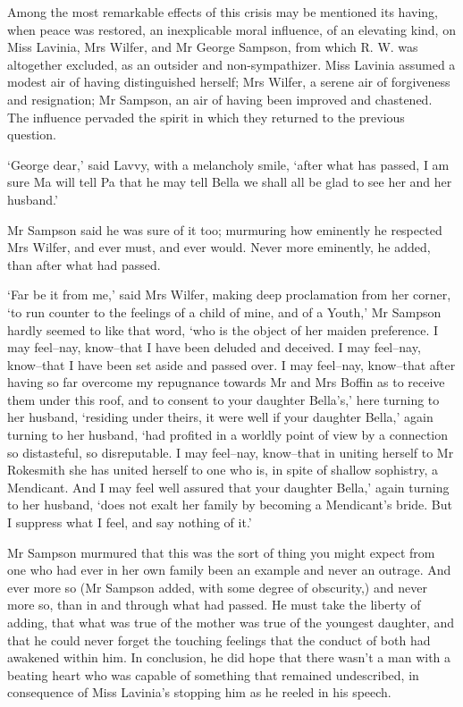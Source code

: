 Among the most remarkable effects of this crisis may be mentioned its
having, when peace was restored, an inexplicable moral influence, of an
elevating kind, on Miss Lavinia, Mrs Wilfer, and Mr George Sampson, from
which R. W. was altogether excluded, as an outsider and non-sympathizer.
Miss Lavinia assumed a modest air of having distinguished herself; Mrs
Wilfer, a serene air of forgiveness and resignation; Mr Sampson, an air
of having been improved and chastened. The influence pervaded the spirit
in which they returned to the previous question.

‘George dear,’ said Lavvy, with a melancholy smile, ‘after what has
passed, I am sure Ma will tell Pa that he may tell Bella we shall all be
glad to see her and her husband.’

Mr Sampson said he was sure of it too; murmuring how eminently he
respected Mrs Wilfer, and ever must, and ever would. Never more
eminently, he added, than after what had passed.

‘Far be it from me,’ said Mrs Wilfer, making deep proclamation from her
corner, ‘to run counter to the feelings of a child of mine, and of a
Youth,’ Mr Sampson hardly seemed to like that word, ‘who is the object
of her maiden preference. I may feel--nay, know--that I have been
deluded and deceived. I may feel--nay, know--that I have been set
aside and passed over. I may feel--nay, know--that after having so far
overcome my repugnance towards Mr and Mrs Boffin as to receive them
under this roof, and to consent to your daughter Bella’s,’ here turning
to her husband, ‘residing under theirs, it were well if your daughter
Bella,’ again turning to her husband, ‘had profited in a worldly
point of view by a connection so distasteful, so disreputable. I may
feel--nay, know--that in uniting herself to Mr Rokesmith she has united
herself to one who is, in spite of shallow sophistry, a Mendicant. And
I may feel well assured that your daughter Bella,’ again turning to her
husband, ‘does not exalt her family by becoming a Mendicant’s bride. But
I suppress what I feel, and say nothing of it.’

Mr Sampson murmured that this was the sort of thing you might expect
from one who had ever in her own family been an example and never
an outrage. And ever more so (Mr Sampson added, with some degree of
obscurity,) and never more so, than in and through what had passed. He
must take the liberty of adding, that what was true of the mother
was true of the youngest daughter, and that he could never forget the
touching feelings that the conduct of both had awakened within him. In
conclusion, he did hope that there wasn’t a man with a beating heart who
was capable of something that remained undescribed, in consequence of
Miss Lavinia’s stopping him as he reeled in his speech.

